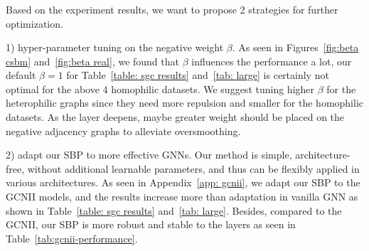 \subsubsection{}
Based on the experiment results, we want to propose 2 strategies for further optimization. 

1) hyper-parameter tuning on the negative weight $\beta$. As seen in Figures~\ref{fig:beta csbm} and~\ref{fig:beta real}, we found that $\beta$ influences the performance a lot, our default $\beta=1$ for Table~\ref{table: sgc results} and~\ref{tab: large} is certainly not optimal for the above 4 homophilic datasets. We suggest tuning higher $\beta$ for the heterophilic graphs since they need more repulsion and smaller for the homophilic datasets.  As the layer deepens, maybe greater weight should be placed on the negative adjacency graphs to alleviate oversmoothing. 

2) adapt our SBP to more effective GNNs. Our method is simple, architecture-free, without additional learnable parameters, and thus can be flexibly applied in various architectures. As seen in Appendix~\ref{app: gcnii}, we adapt our SBP to the GCNII models, and the results increase more than adaptation in vanilla GNN as shown in Table~\ref{table: sgc results} and~\ref{tab: large}. Besides, compared to the GCNII, our SBP is more robust and stable to the layers as seen in Table~\ref{tab:gcnii-performance}.

